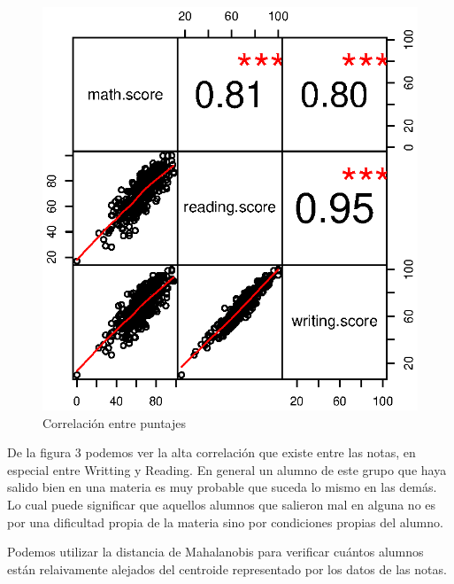 \documentclass{article}
\begin{document}
\begin{figure}[H]
    \centering
    \includegraphics[scale = 0.9]{Output/Plots/5Correlation.eps}
    \caption{Correlaci\'on entre puntajes}
\end{figure}

De la figura 3 podemos ver la alta correlaci\'on que existe entre las notas, en especial entre Writting y Reading. En general
un alumno de este grupo que haya salido bien en una materia es muy probable que suceda lo mismo en las dem\'as. Lo cual
puede significar que aquellos alumnos que salieron mal en alguna no es por una dificultad propia de la materia sino por 
condiciones propias del alumno.

Podemos utilizar la distancia de Mahalanobis para verificar cu\'antos alumnos est\'an relaivamente alejados del centroide
representado por los datos de las notas.
\end{document}
